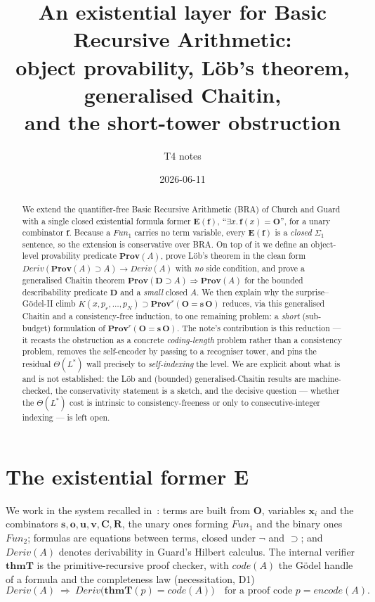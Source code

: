 \documentclass[11pt]{article}
\title{An existential layer for Basic Recursive Arithmetic:\\
       object provability, L\"ob's theorem, generalised Chaitin,\\
       and the short-tower obstruction}
\author{T4 notes}
\date{2026-06-11}
\theoremstyle{plain}
\theoremstyle{definition}
\theoremstyle{remark}
\newcommand{\code}[1]{\mathit{code}(#1)}
\newcommand{\thmT}{\mathbf{thmT}}
\newcommand{\Ee}{\mathbf{E}}
\newcommand{\Prov}{\mathbf{Prov}}
\newcommand{\Fun}{\mathit{Fun}}
\newcommand{\Deriv}{\mathit{Deriv}}
\newcommand{\describe}{\mathbf{D}}
\begin{document}
\maketitle

\begin{abstract}
We extend the quantifier-free Basic Recursive Arithmetic (BRA) of Church and
Guard with a single closed existential formula former $\Ee(\mathbf{f})$,
``$\exists x.\,\mathbf{f}(x)=\mathbf{O}$'', for a unary combinator
$\mathbf{f}$. Because a $\Fun_1$ carries no term variable, every $\Ee(\mathbf{f})$
is a \emph{closed} $\Sigma_1$ sentence, so the extension is conservative over BRA.
On top of it we define an object-level provability predicate
$\Prov(A)$, prove L\"ob's theorem in the clean form
$\Deriv(\Prov(A)\supset A)\to\Deriv(A)$ with \emph{no} side condition, and prove
a generalised Chaitin theorem
$\Prov(\describe\supset A)\Rightarrow\Prov(A)$ for the bounded describability
predicate $\describe$ and a \emph{small} closed $A$. We then explain why the
surprise--G\"odel-II climb $K(x,p_r,\dots,p_N)\supset\Prov^r(\mathbf{O}{=}\mathbf{s}\,\mathbf{O})$
reduces, via this generalised Chaitin and a consistency-free induction, to one
remaining problem: a \emph{short} (sub-budget) formulation of
$\Prov^r(\mathbf{O}{=}\mathbf{s}\,\mathbf{O})$. The note's contribution is this
reduction --- it recasts the obstruction as a concrete \emph{coding-length}
problem rather than a consistency problem, removes the self-encoder by passing to
a recogniser tower, and pins the residual $\Theta(L^{*})$ wall precisely to
\emph{self-indexing} the level. We are explicit about what is and is not
established: the L\"ob and (bounded) generalised-Chaitin results are
machine-checked, the conservativity statement is a sketch, and the decisive
question --- whether the $\Theta(L^{*})$ cost is intrinsic to consistency-freeness
or only to consecutive-integer indexing --- is left open.
\end{abstract}

\section{The existential former $\Ee$}

We work in the system recalled in~\cite{arGII}: terms are built from
$\mathbf{O}$, variables $\mathbf{x}_i$ and the combinators
$\mathbf{s},\mathbf{o},\mathbf{u},\mathbf{v},\mathbf{C},\mathbf{R}$, the unary
ones forming $\Fun_1$ and the binary ones $\Fun_2$; formulas are equations
between terms, closed under $\neg$ and $\supset$; and $\Deriv(A)$ denotes
derivability in Guard's Hilbert calculus. The internal verifier $\thmT$ is the
primitive-recursive proof checker, with $\code{A}$ the G\"odel handle of a
formula and the completeness law (necessitation, D1)
\[
  \Deriv(A)\ \Longrightarrow\ \Deriv\bigl(\thmT(p)=\code{A}\bigr)
  \quad\text{for a proof code }p=\mathit{encode}(A).
\]
\end{document}
